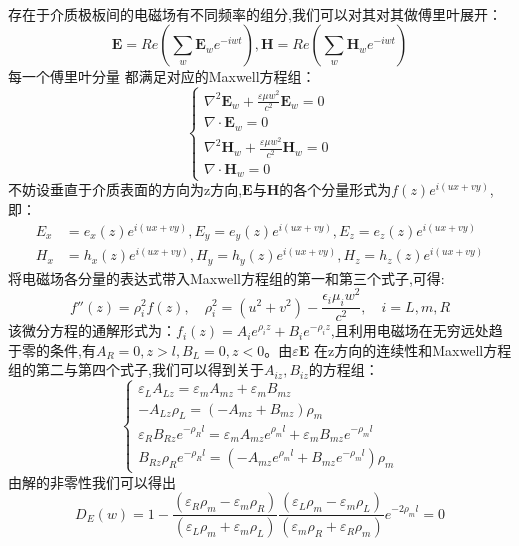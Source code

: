 \paragraph*{}
存在于介质极板间的电磁场有不同频率的组分,我们可以对其对其做傅里叶展开：
$$\boldsymbol{E}=Re(\sum_{w} \boldsymbol{E}_w e^{-iwt}),\boldsymbol{H}=Re(\sum_{w} \boldsymbol{H}_w e^{-iwt})$$
每一个傅里叶分量 都满足对应的Maxwell方程组：
$$
\begin{cases}
\nabla ^2 \boldsymbol{E}_w +\frac{\varepsilon \mu w^2}{c^2}\boldsymbol{E}_w=0\\
\nabla \cdot \boldsymbol{E}_w=0\\
\nabla ^2 \boldsymbol{H}_w +\frac{\varepsilon \mu w^2}{c^2}\boldsymbol{H}_w=0\\
\nabla \cdot \boldsymbol{H}_w=0
\end{cases}
$$
不妨设垂直于介质表面的方向为z方向,$\boldsymbol{E}$与$\boldsymbol{H}$的各个分量形式为$f(z)e^{i(ux+vy)}$,即：
\begin{equation*}
\begin{split}
E_x&=e_x(z)e^{i(ux+vy)},E_y=e_y(z)e^{i(ux+vy)},E_z=e_z(z)e^{i(ux+vy)}\\
H_x&=h_x(z)e^{i(ux+vy)},H_y=h_y(z)e^{i(ux+vy)},H_z=h_z(z)e^{i(ux+vy)}
\end{split}
\end{equation*}
将电磁场各分量的表达式带入Maxwell方程组的第一和第三个式子,可得:
$$
f''(z)=\rho_i ^2 f(z),\quad \rho_i ^2=(u^2+v^2)-\frac{\epsilon_i \mu_i w^2}{c^2},\quad i=L,m,R
$$
该微分方程的通解形式为：$f_i(z)=A_i e^{\rho_i z}+B_i e^{-\rho_i z}$,且利用电磁场在无穷远处趋于零的条件,有$A_R=0,z>l,B_L=0,z<0$。由$\varepsilon \boldsymbol{E}$ 在z方向的连续性和Maxwell方程组的第二与第四个式子,我们可以得到关于$A_{iz},B_{iz}$的方程组：
$$
\begin{cases}
\varepsilon_L A_{Lz}=\varepsilon_m A_{mz} + \varepsilon_m B_{mz}\\
-A_{Lz}\rho_L=(-A_{mz} + B_{mz})\rho_m\\
\varepsilon_R B_{Rz} e^{-\rho_R l}=\varepsilon_m A_{mz} e^{\rho_m l} + \varepsilon_m B_{mz}e^{-\rho_m l}\\
B_{Rz}\rho_R e^{-\rho_R l}=(-A_{mz} e^{\rho_m l}+ B_{mz}e^{-\rho_m l})\rho_m
\end{cases}
$$
由解的非零性我们可以得出
$$
D_E (w)=1-\frac{\left( \varepsilon _R\rho _m-\varepsilon _m\rho _R \right)}{\left( \varepsilon _L\rho _m+\varepsilon _m\rho _L \right)}\frac{\left( \varepsilon _L\rho _m-\varepsilon _m\rho _L \right)}{\left( \varepsilon _m\rho _R+\varepsilon _R\rho _m \right)}e^{-2\rho _ml}=0
$$
